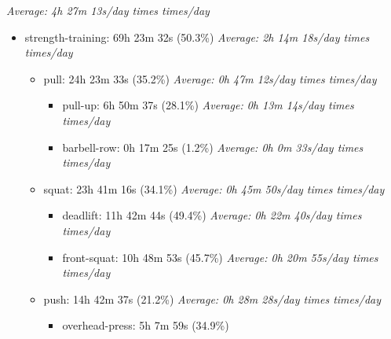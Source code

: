 \documentclass[12pt]{extarticle}
\begin{document}
\textit{Average: 4h 27m 13s/day  times  times/day}\par
\begin{itemize}[topsep=0pt, itemsep=-0.5ex]
    \item strength-training: 69h 23m 32s (50.3\%)
        \textit{Average: 2h 14m 18s/day  times  times/day}\par
\begin{itemize}[topsep=0pt, itemsep=-0.5ex]
    \item pull: 24h 23m 33s (35.2\%)
        \textit{Average: 0h 47m 12s/day  times  times/day}\par
\begin{itemize}[topsep=0pt, itemsep=-0.5ex]
    \item pull-up: 6h 50m 37s (28.1\%)
        \textit{Average: 0h 13m 14s/day  times  times/day}\par
    \item barbell-row: 0h 17m 25s (1.2\%)
        \textit{Average: 0h 0m 33s/day  times  times/day}\par
\end{itemize}
    \item squat: 23h 41m 16s (34.1\%)
        \textit{Average: 0h 45m 50s/day  times  times/day}\par
\begin{itemize}[topsep=0pt, itemsep=-0.5ex]
    \item deadlift: 11h 42m 44s (49.4\%)
        \textit{Average: 0h 22m 40s/day  times  times/day}\par
    \item front-squat: 10h 48m 53s (45.7\%)
        \textit{Average: 0h 20m 55s/day  times  times/day}\par
\end{itemize}
    \item push: 14h 42m 37s (21.2\%)
        \textit{Average: 0h 28m 28s/day  times  times/day}\par
\begin{itemize}[topsep=0pt, itemsep=-0.5ex]
    \item overhead-press: 5h 7m 59s (34.9\%)

\end{itemize}
\end{itemize}
\end{itemize}
\end{document}
